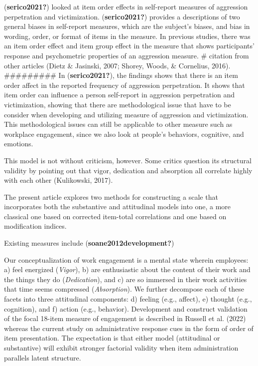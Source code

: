 \documentclass[
  man]{apa7}
\begin{document}
(\textbf{serico2021?}) looked at item order effects in self-report measures of aggression perpetration and victimization. (\textbf{serico2021?}) provides a descriptions of two general biases in self-report measures, which are the subject's biases, and bias in wording, order, or format of items in the measure. In previous studies, there was an item order effect and item group effect in the measure that shows participants' response and psychometric properties of an aggression measure. \# citation from other articles (Dietz \& Jasinski, 2007; Shorey, Woods, \& Cornelius, 2016). \#\#\#\#\#\#\#\#\# In (\textbf{serico2021?}), the findings shows that there is an item order affect in the reported frequency of aggression perpetration. It shows that item order can influence a person self-report in aggression perpetration and victimization, showing that there are methodological issue that have to be consider when developing and utilizing measure of aggression and victimization. This methodological issues can still be applicable to other measure such as workplace engagement, since we also look at people's behaviors, cognitive, and emotions.

This model is not without criticism, however. Some critics question its structural validity by pointing out that vigor, dedication and absorption all correlate highly with each other (Kulikowski, 2017).

The present article explores two methods for constructing a scale that incorporates both the substantive and attitudinal models into one, a more classical one based on corrected item-total correlations and one based on modification indices.

Existing measures include (\textbf{soane2012development?})

Our conceptualization of work engagement is a mental state wherein employees: a) feel energized (\emph{Vigor}), b) are enthusiastic about the content of their work and the things they do (\emph{Dedication}), and c) are so immersed in their work activities that time seems compressed (\emph{Absorption}). We further decompose each of these facets into three attitudinal components: d) feeling (e.g., affect), e) thought (e.g., cognition), and f) action (e.g., behavior). Development and construct validation of the focal 18-item measure of engagement is described in Russell et al. (2022) whereas the current study on administrative response cues in the form of order of item presentation. The expectation is that either model (attitudinal or substantive) will exhibit stronger factorial validity when item administration parallels latent structure.
\end{document}
